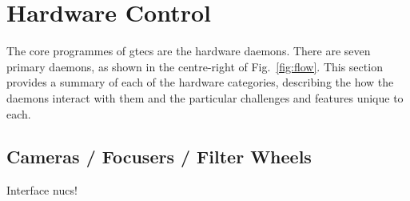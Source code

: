 \section{Hardware Control}
\label{sec:hardware_control}
\begin{colsection}


\begin{colsection}

The core programmes of \gls{gtecs} are the hardware daemons. There are seven primary daemons, as shown in the centre-right of Fig.~\ref{fig:flow}. This section provides a summary of each of the hardware categories, describing the how the daemons interact with them and the particular challenges and features unique to each.

\end{colsection}


\subsection{Cameras / Focusers / Filter Wheels}
\label{sec:fli}
\begin{colsection}

Interface \glspl{nuc}!


\end{colsection}
\end{colsection}
